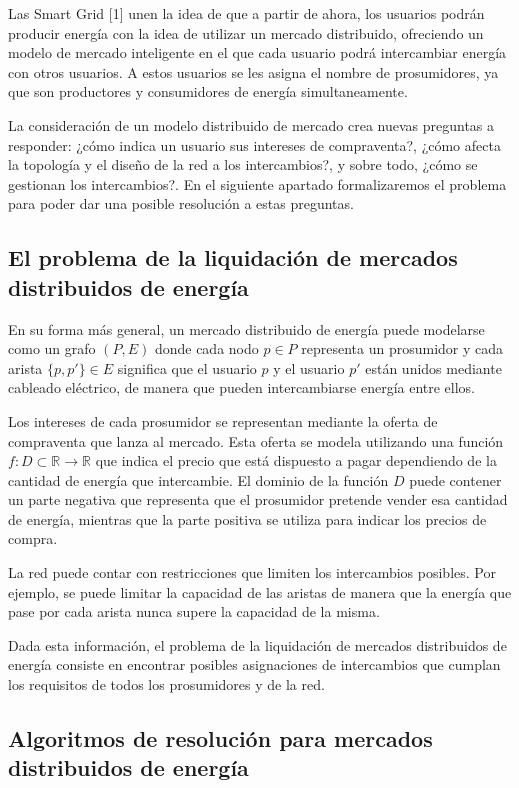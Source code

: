 \documentclass[12pt,a4paper,openright,oneside]{article}
\newcommand{\R}{\mathbb{R}}
\numberwithin{equation}{section}
\theoremstyle{definition}
\begin{document}
Las Smart Grid [1] unen la idea de que a partir de ahora, los usuarios podrán producir energía con la idea de utilizar un mercado distribuido, ofreciendo un modelo de mercado inteligente en el que cada usuario podrá intercambiar energía con otros usuarios. A estos usuarios se les asigna el nombre de prosumidores, ya que son productores y consumidores de energía simultaneamente. 

La consideración de un modelo distribuido de mercado crea nuevas preguntas a responder: ¿cómo indica un usuario sus intereses de compraventa?, ¿cómo afecta la topología y el diseño de la red a los intercambios?, y sobre todo, ¿cómo se gestionan los intercambios?. En el siguiente apartado formalizaremos el problema para poder dar una posible resolución a estas preguntas.

\subsection{El problema de la liquidación de mercados distribuidos de energía}

En su forma más general, un mercado distribuido de energía puede modelarse como un grafo $(P,E)$ donde cada nodo $p \in P$ representa un prosumidor y cada arista $\{p,p'\} \in E$ significa que el usuario $p$ y el usuario $p'$ están unidos mediante cableado eléctrico, de manera que pueden intercambiarse energía entre ellos.

Los intereses de cada prosumidor se representan mediante la oferta de compraventa que lanza al mercado. Esta oferta se modela utilizando una función $f:D \subset \R \to \R$ que indica el precio que está dispuesto a pagar dependiendo de la cantidad de energía que intercambie. El dominio de la función $D$ puede contener un parte negativa que representa que el prosumidor pretende vender esa cantidad de energía, mientras que la parte positiva se utiliza para indicar los precios de compra.

La red puede contar con restricciones que limiten los intercambios posibles. Por ejemplo, se puede limitar la capacidad de las aristas de manera que la energía que pase por cada arista nunca supere la capacidad de la misma.

Dada esta información, el problema de la liquidación de mercados distribuidos de energía consiste en encontrar posibles asignaciones de intercambios que cumplan los requisitos de todos los prosumidores y de la red.

\subsection{Algoritmos de resolución para mercados distribuidos de energía} 
\end{document}
